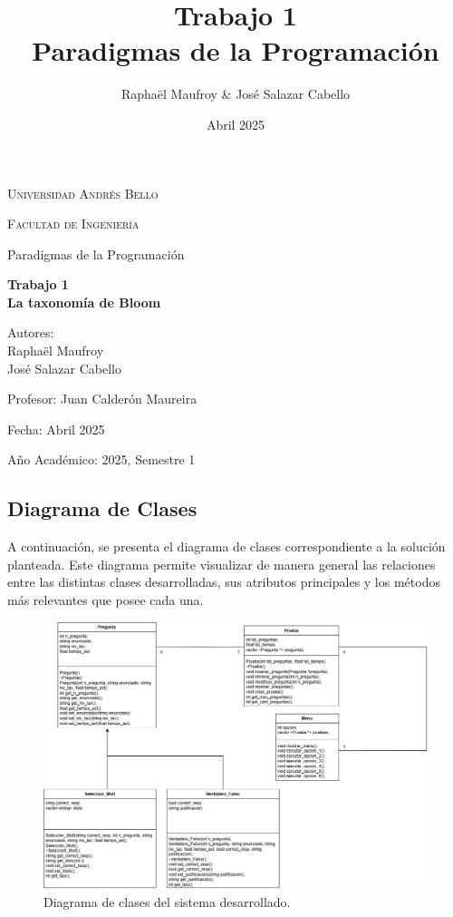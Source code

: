 \documentclass[12pt]{article}
\title{Trabajo 1\\ Paradigmas de la Programaci\'on}
\author{Rapha\"el Maufroy \& Jos\'e Salazar Cabello}
\date{Abril 2025}
\begin{document}
\begin{titlepage}
    \centering
    \vspace*{2cm}
    {\scshape\LARGE Universidad Andr\'es Bello \par}
    \vspace{1cm}
    {\scshape\Large Facultad de Ingenier\'ia\par}
    \vspace{1.5cm}
    {\Large Paradigmas de la Programaci\'on\par}
    \vspace{0.5cm}
    {\huge\bfseries Trabajo 1\\La taxonom\'ia de Bloom \par}
    \vspace{2cm}
    {\Large Autores: \\Rapha\"el Maufroy\\Jos\'e Salazar Cabello\par}
    \vspace{0.5cm}
    {\Large Profesor: Juan Calder\'on Maureira\par}
    \vspace{0.5cm}
    {\Large Fecha: Abril 2025\par}
    \vfill
    {\large A\~no Acad\'emico: 2025, Semestre 1\par}
\end{titlepage}

\newpage
\subsection{Diagrama de Clases}

A continuación, se presenta el diagrama de clases correspondiente a la solución planteada. Este diagrama permite visualizar de manera general las relaciones entre las distintas clases desarrolladas, sus atributos principales y los métodos más relevantes que posee cada una.
\vspace{0.5cm}
\begin{figure}[h!]
    \centering
    \includegraphics[width=1\linewidth]{TAREA_1PARAPROGRA.png}
    \caption{Diagrama de clases del sistema desarrollado.}
    \label{fig:diagrama-clases}
\end{figure}
\newpage
\end{document}
